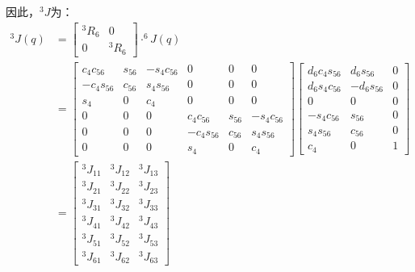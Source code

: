 \documentclass{ctexart}
\begin{document}
因此，$^3J$为：
\begin{equation}
	\begin{aligned}
	^3J (q)&= \begin{bmatrix}
		^3R_6 & 0\\
		0 & ^3R_6
	\end{bmatrix} \cdot ^6J(q) \\
	&= \begin{bmatrix}
		c_4c_{56} & s_{56} & -s_4c_{56} & 0 & 0 & 0\\
		-c_4s_{56} & c_{56} & s_4s_{56} & 0 & 0 & 0\\
		s_4 & 0 & c_4 & 0 & 0 & 0\\
		0 & 0 & 0 & c_4c_{56} & s_{56} & -s_4c_{56}\\
		0 & 0 & 0 & -c_4s_{56} & c_{56} & s_4s_{56}\\
		0 & 0 & 0 & s_4 & 0 & c_4
	\end{bmatrix}
	\begin{bmatrix}
		d_6c_4s_{56} & d_6s_{56} & 0\\
		d_6s_4c_{56} & -d_6s_{56} & 0\\
		0 & 0 & 0 \\
		-s_4c_{56} & s_{56} & 0\\
		s_4s_{56} & c_{56} & 0\\
		c_4 & 0 & 1
	\end{bmatrix}\\
	&= \begin{bmatrix}
		^3J_{11} & ^3J_{12} & ^3J_{13}\\
		^3J_{21} & ^3J_{22} & ^3J_{23}\\
		^3J_{31} & ^3J_{32} & ^3J_{33}\\
		^3J_{41} & ^3J_{42} & ^3J_{43}\\
		^3J_{51} & ^3J_{52} & ^3J_{53}\\
		^3J_{61} & ^3J_{62} & ^3J_{63}
	\end{bmatrix}
\end{aligned}
\end{equation}
\end{document}
